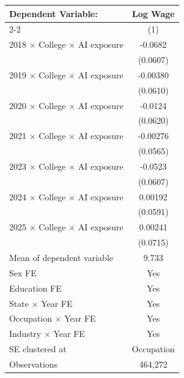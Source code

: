 \def\sym#1{\ifmmode^{#1}\else\(^{#1}\)\fi}
\begin{tabular}{l*{1}{c}}
\toprule
Dependent Variable: & \multicolumn{1}{c}{Log Wage} \\
\cmidrule(lr){2-2}
 & (1) \\
\midrule
2018 $\times$ College $\times$ AI exposure&     -0.0682   \\
            &    (0.0607)   \\
2019 $\times$ College $\times$ AI exposure&    -0.00380   \\
            &    (0.0610)   \\
2020 $\times$ College $\times$ AI exposure&     -0.0124   \\
            &    (0.0620)   \\
2021 $\times$ College $\times$ AI exposure&    -0.00276   \\
            &    (0.0565)   \\
2023 $\times$ College $\times$ AI exposure&     -0.0523   \\
            &    (0.0607)   \\
2024 $\times$ College $\times$ AI exposure&     0.00192   \\
            &    (0.0591)   \\
2025 $\times$ College $\times$ AI exposure&     0.00241   \\
            &    (0.0715)   \\
\midrule
Mean of dependent variable&       9.733   \\
Sex FE      &         Yes   \\
Education FE&         Yes   \\
State $\times$ Year FE&         Yes   \\
Occupation $\times$ Year FE&         Yes   \\
Industry $\times$ Year FE&         Yes   \\
SE clustered at&  Occupation   \\
Observations&     464,272   \\
\bottomrule
\end{tabular}
